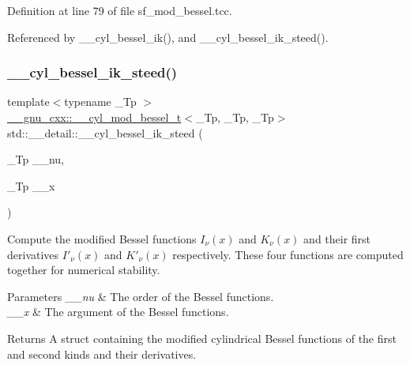 Definition at line 79 of file sf\+\_\+mod\+\_\+bessel.\+tcc.



Referenced by \+\_\+\+\_\+cyl\+\_\+bessel\+\_\+ik(), and \+\_\+\+\_\+cyl\+\_\+bessel\+\_\+ik\+\_\+steed().

\mbox{\label{namespacestd_1_1____detail_a0995aa3ea71e25f413e73c07f6b47542}} 
\subsubsection{\texorpdfstring{\+\_\+\+\_\+cyl\+\_\+bessel\+\_\+ik\+\_\+steed()}{\_\_cyl\_bessel\_ik\_steed()}}
{\footnotesize\ttfamily template$<$typename \+\_\+\+Tp $>$ \\
\hyperlink{struct____gnu__cxx_1_1____cyl__mod__bessel__t}{\+\_\+\+\_\+gnu\+\_\+cxx\+::\+\_\+\+\_\+cyl\+\_\+mod\+\_\+bessel\+\_\+t}$<$\+\_\+\+Tp, \+\_\+\+Tp, \+\_\+\+Tp$>$ std\+::\+\_\+\+\_\+detail\+::\+\_\+\+\_\+cyl\+\_\+bessel\+\_\+ik\+\_\+steed (\begin{DoxyParamCaption}\item[{\+\_\+\+Tp}]{\+\_\+\+\_\+nu,  }\item[{\+\_\+\+Tp}]{\+\_\+\+\_\+x }\end{DoxyParamCaption})}



Compute the modified Bessel functions $ I_\nu(x) $ and $ K_\nu(x) $ and their first derivatives $ I'_\nu(x) $ and $ K'_\nu(x) $ respectively. These four functions are computed together for numerical stability. 


\begin{DoxyParams}{Parameters}
{\em \+\_\+\+\_\+nu} & The order of the Bessel functions. \\
\hline
{\em \+\_\+\+\_\+x} & The argument of the Bessel functions. \\
\hline
\end{DoxyParams}
\begin{DoxyReturn}{Returns}
A struct containing the modified cylindrical Bessel functions of the first and second kinds and their derivatives. 
\end{DoxyReturn}


